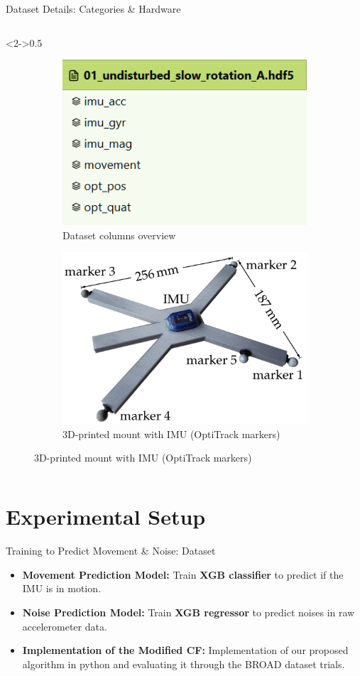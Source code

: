 \documentclass[aspectratio=169,xcolor=dvipsnames]{beamer}
\begin{document}
\begin{frame}{Dataset Details: Categories \& Hardware}
\begin{columns}[T]
  \begin{column}<2->{0.5\textwidth}
    \begin{figure}
      \centering
      \begin{subfigure}[t]{\columnwidth}
        \includegraphics[width=0.5\linewidth]{logos/dataset.png}
        \caption{Dataset columns overview}
        \label{fig:datase}
      \end{subfigure}
      \vspace{0.5em}
      \begin{subfigure}[t]{\columnwidth}
        \includegraphics[width=0.5\linewidth]{logos/imu_hardware_mount.png}
        \caption{3D-printed mount with IMU (OptiTrack markers)}
        \label{fig:IMUhardware}
      \end{subfigure}
    \end{figure}
  \end{column}
\end{columns}
\end{frame}

\section{Experimental Setup}

\begin{frame}{Training to Predict Movement & Noise: Dataset}
\begin{itemize}[<+->]
    \item \textbf{Movement Prediction Model:} Train \textbf{XGB classifier} to predict if the IMU is in motion.
    \item \textbf{Noise Prediction Model:} Train \textbf{XGB regressor} to predict noises in raw accelerometer data.
    \item \textbf{Implementation of the Modified CF:} Implementation of our proposed algorithm in python and evaluating it through the BROAD dataset trials.
\end{itemize}

\end{frame}
\end{document}
